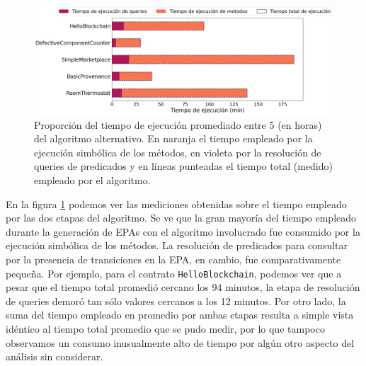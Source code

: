 \begin{figure}
    \includegraphics[width=\textwidth]{figs/categories-bar-graph.png}
    \caption{Proporción del tiempo de ejecución promediado entre 5 (en horas) del algoritmo alternativo.
        En naranja el tiempo empleado por la ejecución simbólica de los métodos, en violeta por la resolución de queries de predicados y en líneas punteadas el tiempo total (medido) empleado por el algoritmo.}
    \label{fig:tiempo-categorias}
\end{figure}

En la figura \ref{fig:tiempo-categorias} podemos ver las mediciones obtenidas sobre el tiempo empleado por las dos etapas del algoritmo.
Se ve que la gran mayoría del tiempo empleado durante la generación de EPAs con el algoritmo involucrado fue consumido por la ejecución simbólica de los métodos.
La resolución de predicados para consultar por la presencia de transiciones en la EPA, en cambio, fue comparativamente pequeña.
Por ejemplo, para el contrato \texttt{HelloBlockchain}, podemos ver que a pesar que el tiempo total promedió cercano los 94 minutos, la etapa de resolución de queries demoró tan sólo valores cercanos a los 12 minutos.
Por otro lado, la suma del tiempo empleado en promedio por ambas etapas resulta a simple vista idéntico al tiempo total promedio que se pudo medir, por lo que tampoco observamos un consumo inusualmente alto de tiempo por algún otro aspecto del análisis sin considerar.


